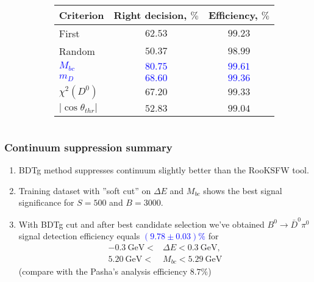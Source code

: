 \documentclass[10 pt,compress,mathserif]{beamer}
\newcommand{\bdpi}{\ensuremath{B^0\to \bar D^0\pi^0}\xspace}
\begin{document}
\begin{frame}
\begin{small}
\begin{columns}
\begin{column}{0.4\textwidth}
  \end{column}
  \begin{column}{0.6\textwidth}
   \begin{table}[bt]
   \small
   \begin{tabular}{|l|c|c|} \hline
   {Criterion} & {Right decision}, $\%$ & {Efficiency}, $\%$ \\ \hline
   First              & $62.53$ & $99.23$ \\ \hline
   Random             & $50.37$ & $98.99$ \\ \hline
   \textcolor{blue}{$M_{bc}$} & \textcolor{blue}{$80.75$} & \textcolor{blue}{$99.61$} \\ \hline
   \textcolor{blue}{$m_D$}    & \textcolor{blue}{$68.60$} & \textcolor{blue}{$99.36$} \\ \hline
   $\chi^2(D^0)$      & $67.20$ & $99.33$ \\ \hline
   $\left|\cos\theta_{thr}\right|$ & $52.83$ & $99.04$ \\ \hline
   \end{tabular}
   \end{table}
  \end{column}
 \end{columns}
\end{small}
\end{frame}

\begin{frame}
 \frametitle{Continuum suppression summary}
 \begin{enumerate}
  \item BDTg method suppresses continuum slightly better than the RooKSFW tool.
  \item Training dataset with ''soft cut'' on $\Delta E$ and $M_{bc}$ shows the best signal significance for $S=500$ and $B=3000$.
  \item With BDTg cut and after best candidate selection we've obtained \bdpi signal detection efficiency equals \textcolor{blue}{$(9.78\pm0.03)\%$} for
  \begin{equation*}
  \begin{split}
   -0.3\ \text{GeV} < &\Delta E < 0.3\ \text{GeV},\\
    5.20\ \text{GeV} < &M_{bc} < 5.29\ \text{GeV}
  \end{split}
  \end{equation*}
  (compare with the Pasha's analysis efficiency $8.7\%$)
 \end{enumerate}
\end{frame}
\end{document}

